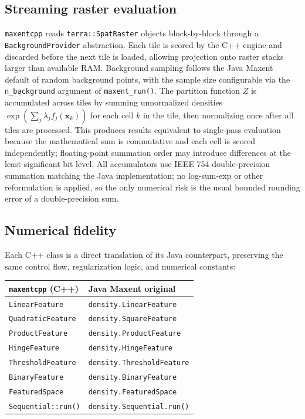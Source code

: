 \documentclass[10pt,letterpaper]{article}
\newcounter{none} %
\begin{document}
\subsection*{Streaming raster
evaluation}

\texttt{maxentcpp} reads \texttt{terra::SpatRaster} objects
block-by-block through a \texttt{BackgroundProvider} abstraction. Each
tile is scored by the C++ engine and discarded before the next tile is
loaded, allowing projection onto raster stacks larger than available
RAM. Background sampling follows the Java Maxent default of random
background points, with the sample size configurable via the
\texttt{n\_background} argument of \texttt{maxent\_run()}. The partition
function \(Z\) is accumulated across tiles by summing unnormalized
densities \(\exp(\sum_j \lambda_j f_j(\mathbf{x}_k))\) for each cell
\(k\) in the tile, then normalizing once after all tiles are processed.
This produces results equivalent to single-pass evaluation because the
mathematical sum is commutative and each cell is scored independently;
floating-point summation order may introduce differences at the
least-significant bit level. All accumulators use IEEE 754
double-precision summation matching the Java implementation; no
log-sum-exp or other reformulation is applied, so the only numerical
risk is the usual bounded rounding error of a double-precision sum.

\subsection*{Numerical fidelity}

Each C++ class is a direct translation of its Java counterpart,
preserving the same control flow, regularization logic, and numerical
constants:

{\def\LTcaptype{none} %
\begin{longtable}[]{@{}ll@{}}
\toprule\noalign{}
\texttt{maxentcpp} (C++) & Java Maxent original \\
\midrule\noalign{}
\endhead
\bottomrule\noalign{}
\endlastfoot
\texttt{LinearFeature} & \texttt{density.LinearFeature} \\
\texttt{QuadraticFeature} & \texttt{density.SquareFeature} \\
\texttt{ProductFeature} & \texttt{density.ProductFeature} \\
\texttt{HingeFeature} & \texttt{density.HingeFeature} \\
\texttt{ThresholdFeature} & \texttt{density.ThresholdFeature} \\
\texttt{BinaryFeature} & \texttt{density.BinaryFeature} \\
\texttt{FeaturedSpace} & \texttt{density.FeaturedSpace} \\
\texttt{Sequential::run()} & \texttt{density.Sequential.run()} \\
\end{longtable}
}
\end{document}
